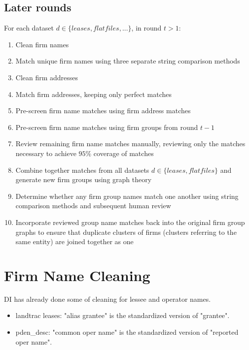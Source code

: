 \documentclass{article}
\begin{document}
\subsection{Later rounds}
For each dataset $d \in \{leases, flatfiles, ... \}$, in round $t > 1$:
\begin{enumerate}
    \item Clean firm names 
    
    \item Match unique firm names using three separate string comparison methods
    
    \item Clean firm addresses 
    
    \item Match firm addresses, keeping only perfect matches

    \item Pre-screen firm name matches using firm address matches
    
    \item Pre-screen firm name matches using firm groups from round $t - 1$
    
    \item Review remaining firm name matches manually, reviewing only the matches necessary to achieve $95\%$ coverage of matches
    
    \item Combine together matches from all datasets $d \in \{leases, flatfiles\}$ and generate new firm groups using graph theory
    
    \item Determine whether any firm group names match one another using string comparison methods and subsequent human review
    
    \item Incorporate reviewed group name matches back into the original firm group graphs to ensure that duplicate clusters of firms (clusters referring to the same entity) are joined together as one 
\end{enumerate}

\section{Firm Name Cleaning}

DI has already done some of cleaning for lessee and operator names.
\begin{itemize}
    \item landtrac leases: "alias grantee" is the standardized version of "grantee".
    \item pden\_desc: "common oper name" is the standardized version of "reported oper name".
\end{itemize}
\end{document}
